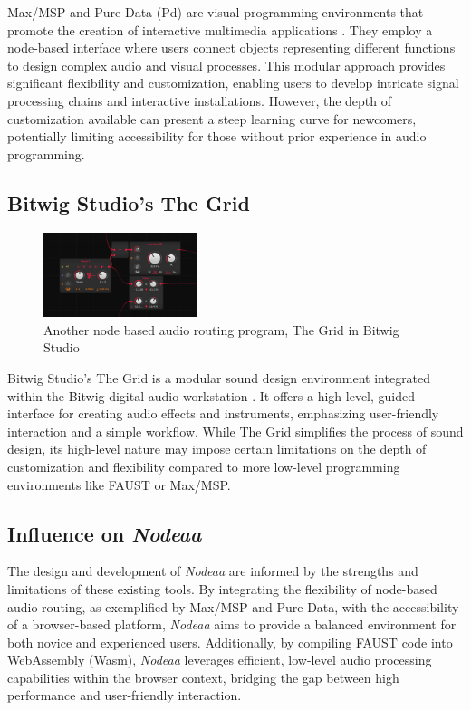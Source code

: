 \documentclass[10pt,twocolumn]{article}
\begin{document}
Max/MSP and Pure Data (Pd) are visual programming environments that promote the creation of interactive multimedia applications \cite{puckette1996pure}. They employ a node-based interface where users connect objects representing different functions to design complex audio and visual processes. This modular approach provides significant flexibility and customization, enabling users to develop intricate signal processing chains and interactive installations. However, the depth of customization available can present a steep learning curve for newcomers, potentially limiting accessibility for those without prior experience in audio programming.

\subsection{Bitwig Studio's The Grid}

\begin{figure}[ht]
    \centering
    \includegraphics[width=0.4\textwidth]{images/thegrid.png}
    \caption{Another node based audio routing program, The Grid in Bitwig Studio}
    \label{fig:grid}
\end{figure}

Bitwig Studio's The Grid is a modular sound design environment integrated within the Bitwig digital audio workstation \cite{burt2023new}. It offers a high-level, guided interface for creating audio effects and instruments, emphasizing user-friendly interaction and a simple workflow. While The Grid simplifies the process of sound design, its high-level nature may impose certain limitations on the depth of customization and flexibility compared to more low-level programming environments like FAUST or Max/MSP.

\subsection{Influence on \textit{Nodeaa}}

The design and development of \textit{Nodeaa} are informed by the strengths and limitations of these existing tools. By integrating the flexibility of node-based audio routing, as exemplified by Max/MSP and Pure Data, with the accessibility of a browser-based platform, \textit{Nodeaa} aims to provide a balanced environment for both novice and experienced users. Additionally, by compiling FAUST code into WebAssembly (Wasm), \textit{Nodeaa} leverages efficient, low-level audio processing capabilities within the browser context, bridging the gap between high performance and user-friendly interaction.
\end{document}
